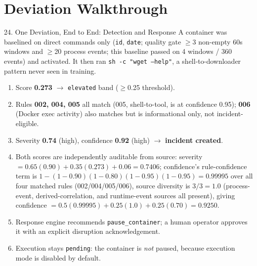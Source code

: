\documentclass[aspectratio=169, 11pt]{beamer}
\begin{document}
\section{Deviation Walkthrough}
\begin{frame}{24. One Deviation, End to End: Detection and Response}
    \footnotesize
    A container was baselined on direct commands only (\texttt{id}, \texttt{date}; quality gate $\geq$3 non-empty 60s windows and $\geq$20 process events; this baseline passed on 4 windows / 360 events) and activated. It then ran \texttt{sh -c "wget --help"}, a shell-to-downloader pattern never seen in training.
    \begin{enumerate}\setlength\itemsep{5pt}
        \item Score \textbf{0.273} $\to$ \texttt{elevated} band ($\geq$0.25 threshold).
        \item Rules \textbf{002, 004, 005} all match (005, shell-to-tool, is at confidence 0.95); \textbf{006} (Docker exec activity) also matches but is informational only, not incident-eligible.
        \item Severity \textbf{0.74} (high), confidence \textbf{0.92} (high) $\to$ \textbf{incident created}.
        \item Both scores are independently auditable from source: severity $= 0.65(0.90) + 0.35(0.273) + 0.06 = 0.7406$; confidence's rule-confidence term is $1-(1-0.90)(1-0.80)(1-0.95)(1-0.95) = 0.99995$ over all four matched rules (002/004/005/006), source diversity is $3/3 = 1.0$ (process-event, derived-correlation, and runtime-event sources all present), giving confidence $= 0.5(0.99995) + 0.25(1.0) + 0.25(0.70) = 0.9250$.
        \item Response engine recommends \texttt{pause\_container}; a human operator approves it with an explicit disruption acknowledgement.
        \item Execution stays \texttt{pending}: the container is \emph{not} paused, because execution mode is disabled by default.
    \end{enumerate}
\end{frame}
\end{document}
